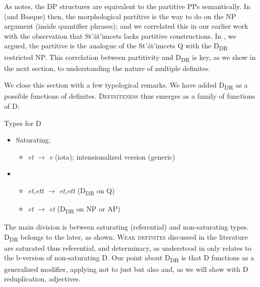 \documentclass[output=paper,
modfonts
]{langscibook}
\begin{document}
As \citeauthor{matthewson1998} notes, the  DP structures are equivalent to the partitive PPs semantically. In  (and Basque) then, the morphological partitive is the way to do  on the NP argument (inside quantifier phrases); and we correlated this in our earlier work with the observation that St'\'at'imcets lacks partitive constructions. In , we argued, the partitive is the analogue of the St'\'at'imcets Q with the D\textsubscript{DR} restricted NP. This correlation between partitivity and D\textsubscript{DR} is key, as we show in the next section, to understanding the nature of multiple definites. 

We close this section with a few typological remarks. We have added D\textsubscript{DR} as a possible functions of definites. \textsc{Definiteness} thus emerges as a family of functions of D: 

\ea\label{ex:etxeberria:41}
	{Types for D}
	\begin{itemize}
	\item {Saturating:} 
		\begin{itemize}
			\item \textit{et} $\rightarrow$ \textit{e} (iota); intensionalized version (generic)
		\end{itemize} 
		\item {}
		\begin{itemize}
			\item \textit{et,ett} $\rightarrow$ \textit{et,ett} (D\textsubscript{DR} on Q)
			\item \textit{et} $\rightarrow$ \textit{et} (D\textsubscript{DR} on NP or AP)
		\end{itemize}
	\end{itemize}
\z

The main division is between saturating (referential) and non-saturating types. D\textsubscript{DR} belongs to the later, as shown. \textsc{Weak definites} discussed in the literature are saturated thus referential, and determinacy, as understood in \citet{CoppockBeaver2015} only relates to the b-version of non-saturating D. Our point about D\textsubscript{DR} is that D functions as a generalized modifier, applying not to just  but also  and, as we will show with D reduplication, adjectives. 
\end{document}

